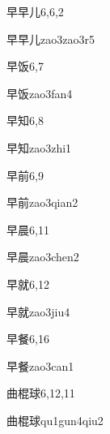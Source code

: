 \begin{entry}{早早儿}{6,6,2}
  \begin{phonetics}{早早儿}{zao3zao3r5}
  \end{phonetics}
\end{entry}

\begin{entry}{早饭}{6,7}
  \begin{phonetics}{早饭}{zao3fan4}
  \end{phonetics}
\end{entry}

\begin{entry}{早知}{6,8}
  \begin{phonetics}{早知}{zao3zhi1}
  \end{phonetics}
\end{entry}

\begin{entry}{早前}{6,9}
  \begin{phonetics}{早前}{zao3qian2}
  \end{phonetics}
\end{entry}

\begin{entry}{早晨}{6,11}
  \begin{phonetics}{早晨}{zao3chen2}
  \end{phonetics}
\end{entry}

\begin{entry}{早就}{6,12}
  \begin{phonetics}{早就}{zao3jiu4}
  \end{phonetics}
\end{entry}

\begin{entry}{早餐}{6,16}
  \begin{phonetics}{早餐}{zao3can1}
  \end{phonetics}
\end{entry}

\begin{entry}{曲棍球}{6,12,11}
  \begin{phonetics}{曲棍球}{qu1gun4qiu2}
  \end{phonetics}
\end{entry}

